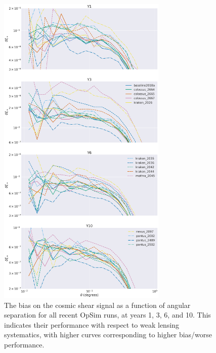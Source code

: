 \begin{figure}[hb]
    \centering
    \caption{The bias on the cosmic shear signal as a function of angular separation for all recent OpSim runs, at years 1, 3, 6, and 10. This indicates their performance with respect to weak lensing systematics, with higher curves corresponding to higher bias/worse performance.}
    \label{fig:WLSystematicsRankings}
\includegraphics[width=0.72\textwidth]{figures/WLSystematicsAllYears.png}
\end{figure}





